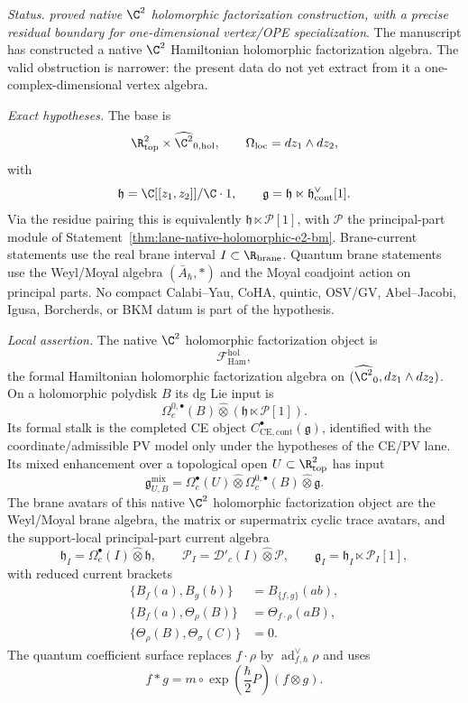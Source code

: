 \begin{stmt}\label{thm:lane-holomorphic-defect-voa-restriction}
  \emph{Status.} \emph{proved native \(\C^2\) holomorphic factorization construction,
  with a precise residual boundary for one-dimensional vertex/OPE
  specialization}.  The manuscript has constructed a native \(\C^2\)
  Hamiltonian holomorphic factorization algebra.  The valid obstruction is
  narrower: the present data do not yet extract from it a
  one-complex-dimensional vertex algebra.

  \emph{Exact hypotheses.} The base is
  \[
    \R^2_{\mathrm{top}}\times
    \widehat{\C^2}_{0,\mathrm{hol}},
    \qquad \Omega_{\mathrm{loc}}=dz_1\wedge dz_2 ,
  \]
  with
  \[
    \mathfrak h=\C[[z_1,z_2]]/\C\cdot1,\qquad
    \mathfrak g=\mathfrak h\ltimes
    \mathfrak h^\vee_{\mathrm{cont}}[1].
  \]
  Via the residue pairing this is equivalently
  \(\mathfrak h\ltimes\mathcal P[1]\), with \(\mathcal P\) the
  principal-part module of
  Statement~\ref{thm:lane-native-holomorphic-e2-bm}.
  Brane-current statements use the real brane interval
  \(I\subset\R_{\mathrm{brane}}\).  Quantum brane statements use the
  Weyl/Moyal algebra \((\bar A_\hbar,*)\) and the Moyal coadjoint action
  on principal parts.  No compact Calabi--Yau, CoHA, quintic, OSV/GV,
  Abel--Jacobi, Igusa, Borcherds, or BKM datum is part of the hypothesis.

  \emph{Local assertion.} The native \(\C^2\) holomorphic factorization
  object is
  \[
    \mathcal F_{\mathrm{Ham}}^{\mathrm{hol}},
  \]
  the formal Hamiltonian holomorphic factorization algebra on
  \((\widehat{\C^2}_0,dz_1\wedge dz_2)\).  On a holomorphic polydisk
  \(B\) its dg Lie input is
  \[
    \Omega^{0,\bullet}_c(B)\widehat\otimes
    (\mathfrak h\ltimes\mathcal P[1]) .
  \]
  Its formal stalk is the completed CE object
  \(C^\bullet_{\mathrm{CE},\mathrm{cont}}(\mathfrak g)\), identified with
  the coordinate/admissible PV model only under the hypotheses of the
  CE/PV lane.  Its mixed enhancement over a topological open
  \(U\subset\R^2_{\mathrm{top}}\) has input
  \[
    \mathfrak g^{\mathrm{mix}}_{U,B}
    =
    \Omega^\bullet_c(U)\widehat\otimes
    \Omega^{0,\bullet}_c(B)\widehat\otimes\mathfrak g .
  \]
  The brane avatars of this native \(\C^2\) holomorphic factorization object are the
  Weyl/Moyal brane algebra, the matrix or supermatrix cyclic trace
  avatars, and the support-local principal-part current algebra
  \[
    \mathfrak h_I=\Omega^\bullet_c(I)\widehat\otimes\mathfrak h,\qquad
    \mathcal P_I=\mathcal D'_c(I)\widehat\otimes\mathcal P,\qquad
    \mathfrak g_I=\mathfrak h_I\ltimes\mathcal P_I[1],
  \]
  with reduced current brackets
  \[
    \begin{aligned}
    \{B_f(a),B_g(b)\}&=B_{\{f,g\}}(ab),\\
    \{B_f(a),\Theta_\rho(B)\}&=\Theta_{f\cdot\rho}(aB),\\
    \{\Theta_\rho(B),\Theta_\sigma(C)\}&=0 .
    \end{aligned}
  \]
  The quantum coefficient surface replaces \(f\cdot\rho\) by
  \(\operatorname{ad}^{\vee}_{f,\hbar}\rho\) and uses
  \[
    f*g=m\circ\exp\!\left(\frac{\hbar}{2}P\right)(f\otimes g).
  \]


\end{stmt}
